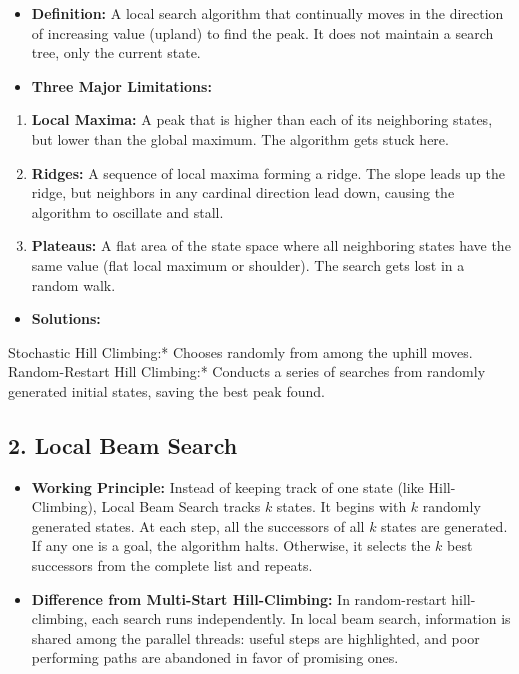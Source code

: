 \begin{itemize}
  \item   \textbf{Definition:} A local search algorithm that continually moves in the direction of increasing value (upland) to find the peak. It does not maintain a search tree, only the current state.
  \item   \textbf{Three Major Limitations:}
\end{itemize}
\begin{enumerate}
  \item \textbf{Local Maxima:} A peak that is higher than each of its neighboring states, but lower than the global maximum. The algorithm gets stuck here.
  \item \textbf{Ridges:} A sequence of local maxima forming a ridge. The slope leads up the ridge, but neighbors in any cardinal direction lead down, causing the algorithm to oscillate and stall.
  \item \textbf{Plateaus:} A flat area of the state space where all neighboring states have the same value (flat local maximum or shoulder). The search gets lost in a random walk.
\end{enumerate}
\begin{itemize}
  \item   \textbf{Solutions:}
\end{itemize}
    \textit{   }Stochastic Hill Climbing:* Chooses randomly from among the uphill moves.
    \textit{   }Random-Restart Hill Climbing:* Conducts a series of searches from randomly generated initial states, saving the best peak found.


\subsection{2. Local Beam Search}
\begin{itemize}
  \item   \textbf{Working Principle:} Instead of keeping track of one state (like Hill-Climbing), Local Beam Search tracks $k$ states. It begins with $k$ randomly generated states. At each step, all the successors of all $k$ states are generated. If any one is a goal, the algorithm halts. Otherwise, it selects the $k$ best successors from the complete list and repeats.
  \item   \textbf{Difference from Multi-Start Hill-Climbing:} In random-restart hill-climbing, each search runs independently. In local beam search, information is shared among the parallel threads: useful steps are highlighted, and poor performing paths are abandoned in favor of promising ones.
\end{itemize}


